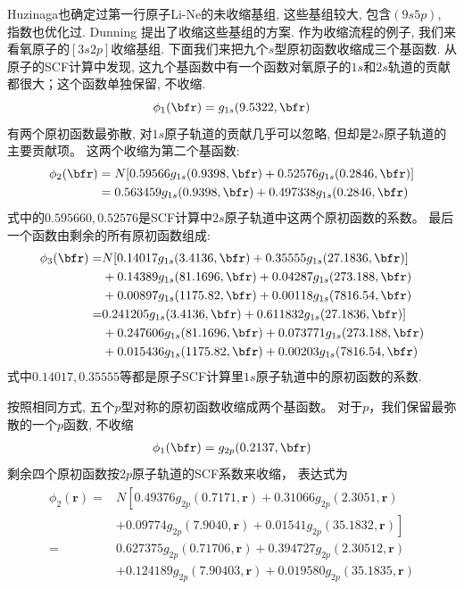Huzinaga也确定过第一行原子Li-Ne的未收缩基组, 这些基组较大, 包含$(9s5p)$, 指数也优化过. 
Dunning  提出了收缩这些基组的方案. 作为收缩流程的例子, 我们来看氧原子的$[3s2p]$收缩基组. 
下面我们来把九个$s$型原初函数收缩成三个基函数. 
从原子的SCF计算中发现, 这九个基函数中有一个函数对氧原子的$1s$和$2s$轨道的贡献都很大；这个函数单独保留, 不收缩.
\begin{equation}
	\label{3.290}
	\phi_1(\bfr)=g_{1s}(9.5322,\bfr)
\end{equation} 
有两个原初函数最弥散, 
对$1s$原子轨道的贡献几乎可以忽略, 
但却是$2s$原子轨道的主要贡献项。
这两个收缩为第二个基函数:
\begin{align}
	\label{3.291}
	\phi_2(\bfr) & = N[0.59566g_{1s}(0.9398,\bfr) + 0.52576 g_{1s}(0.2846,\bfr)]\notag\\
	& = 0.563459 g_{1s}(0.9398,\bfr) + 0.497338 g_{1s}(0.2846,\bfr)
\end{align}
式中的$0.595660,0.52576$是SCF计算中$2s$原子轨道中这两个原初函数的系数。 
最后一个函数由剩余的所有原初函数组成:
\begin{align}
	\phi_3(\bfr) = & N[0.14017g_{1s}(3.4136,\bfr) + 0.35555g_{1s}(27.1836,\bfr)] \notag    \\
	& + 0.14389g_{1s}(81.1696,\bfr) + 0.04287 g_{1s}(273.188,\bfr) \notag   \\
	& + 0.00897g_{1s}(1175.82,\bfr) + 0.00118g_{1s}(7816.54,\bfr) \notag    \\
	= & 0.241205g_{1s}(3.4136,\bfr) + 0.611832g_{1s}(27.1836,\bfr)] \notag    \\
	& + 0.247606g_{1s}(81.1696,\bfr) + 0.073771 g_{1s}(273.188,\bfr) \notag \\
	& + 0.015436g_{1s}(1175.82,\bfr) + 0.00203g_{1s}(7816.54,\bfr)
\end{align}
式中$0.14017, 0.35555$等都是原子SCF计算里$1s$原子轨道中的原初函数的系数.


按照相同方式, 
五个$p$型对称的原初函数收缩成两个基函数。
对于$p$，我们保留最弥散的一个$p$函数, 不收缩
\begin{align}
	\phi_1(\bfr) = g_{2p}(0.2137,\bfr)
\end{align}
剩余四个原初函数按$2p$原子轨道的SCF系数来收缩，
表达式为
\begin{align}
	\begin{aligned}
		\phi_{2}(\mathbf{r})= & N\left[0.49376 g_{2 p}(0.7171, \mathbf{r})+0.31066 g_{2 p}(2.3051, \mathbf{r})\right.  \\
		& \left.+0.09774 g_{2 p}(7.9040, \mathbf{r})+0.01541 g_{2 p}(35.1832, \mathbf{r})\right] \\
		= & 0.627375 g_{2 p}(0.71706, \mathbf{r})+0.394727 g_{2 p}(2.30512, \mathbf{r})            \\
		& +0.124189 g_{2 p}(7.90403, \mathbf{r})+0.019580 g_{2 p}(35.1835, \mathbf{r})
	\end{aligned}
\end{align}

